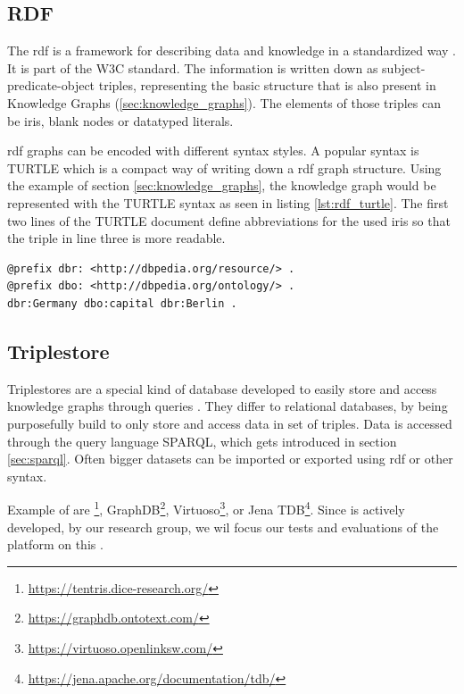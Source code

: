 \subsection{RDF}
\label{sec:rdf}
The \acf{rdf} is a framework for describing data and knowledge in a standardized way \cite{RDFConceptsAbstract}. 
It is part of the W3C standard.
The information is written down as subject-predicate-object triples, representing the basic structure that is also present in Knowledge Graphs (\ref{sec:knowledge_graphs}).
The elements of those triples can be \acp{iri}, blank nodes or datatyped literals.

\ac{rdf} graphs can be encoded with different syntax styles.
A popular syntax is TURTLE \cite{RDFTurtle} which is a compact way of writing down a \ac{rdf} graph structure.
Using the example of section \ref{sec:knowledge_graphs}, the knowledge graph would be represented with the TURTLE syntax as seen in listing \ref{lst:rdf_turtle}.
The first two lines of the TURTLE document define abbreviations for the used \acp{iri} so that the triple in line three is more readable.

\begin{lstlisting}[caption={RDF example in TURTLE syntax}, label=lst:rdf_turtle]
@prefix dbr: <http://dbpedia.org/resource/> .
@prefix dbo: <http://dbpedia.org/ontology/> .
dbr:Germany dbo:capital dbr:Berlin .
\end{lstlisting}


\subsection{Triplestore}
\label{sec:triplestores}
Triplestores are a special kind of database developed to easily store and access knowledge graphs through queries \cite{rusherTriplestoresHttpsWww}.
They differ to relational databases, by being purposefully build to only store and access data in set of triples.
Data is accessed through the query language SPARQL, which gets introduced in section \ref{sec:sparql}.
Often bigger datasets can be imported or exported using \ac{rdf} or other syntax.

Example of \tsp{} are \tentris{}\footnote{\url{https://tentris.dice-research.org/}}, GraphDB\footnote{\url{https://graphdb.ontotext.com/}}, Virtuoso\footnote{\url{https://virtuoso.openlinksw.com/}}, or Jena TDB\footnote{\url{https://jena.apache.org/documentation/tdb/}}.
Since \tentris{} is actively developed, by our research group, we wil focus our tests and evaluations of the platform on this \ts{}.

